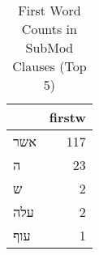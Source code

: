 \begin{table}[htbp!]
\centering
\caption{First Word Counts in SubMod Clauses (Top 5)}
\label{table:SubMod_front}
\begin{tabular}{lr}
\toprule
{} &  firstw \\
\midrule
\texthebrew{אשר} &     117 \\
\texthebrew{ה}   &      23 \\
\texthebrew{ש}   &       2 \\
\texthebrew{עלה} &       2 \\
\texthebrew{עוף} &       1 \\
\bottomrule
\end{tabular}
\end{table}
